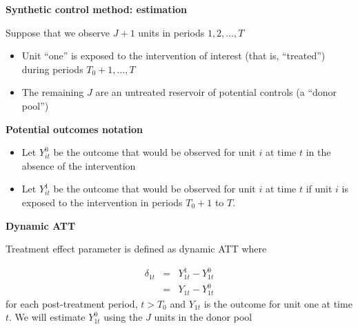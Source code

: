 \documentclass[notes=show]{beamer}
\begin{document}
\begin{frame}[plain]
	\begin{center}
	\textbf{Synthetic control method: estimation}
	\end{center}
	
Suppose that we observe $J+1$ units in periods $1, 2, \dots, T$
		\begin{itemize}
		\item Unit ``one'' is exposed to the intervention of interest (that is, ``treated'') during periods $T_0+1, \dots, T$
		\item The remaining $J$ are an untreated reservoir of potential controls (a ``donor pool'')
		\end{itemize}	
\end{frame}


\begin{frame}[plain]
\begin{center}
\textbf{Potential outcomes notation}
\end{center}

		\begin{itemize}
		\item Let $Y_{it}^0$ be the outcome that would be observed for unit $i$ at time $t$ in the absence of the intervention
		\item Let $Y_{it}^1$ be the outcome that would be observed for unit $i$ at time $t$ if unit $i$ is exposed to the intervention in periods $T_0+1$ to $T$.
		\end{itemize}

\end{frame}

\begin{frame}[plain]
\begin{center}
\textbf{Dynamic ATT}
\end{center}

Treatment effect parameter is defined as dynamic ATT where 

\begin{eqnarray*}
\delta_{1t}&=&Y_{1t}^1 - Y_{1t}^0 \\
&=& Y_{1t} - Y_{1t}^0 
\end{eqnarray*} for each post-treatment period, $t>T_0$ and $Y_{1t}$ is the outcome for unit one at time $t$. We will estimate $Y^0_{1t}$ using the $J$ units in the donor pool 

\end{frame}
\end{document}
